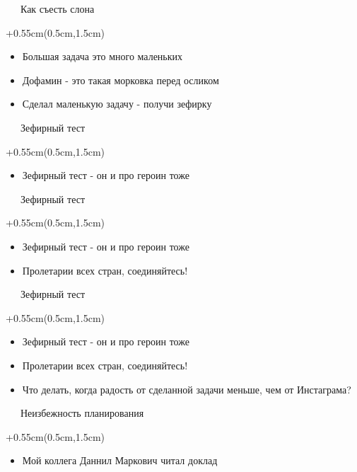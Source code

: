 \documentclass[xetex,18pt,aspectratio=169]{beamer}
\begin{document}
\begin{Large}
\begin{frame}{\ \ \ Как съесть слона}
\begin{textblock*}{\framewidth+0.55cm}(0.5cm,1.5cm)
\begin{itemize}
  \item Большая задача это много маленьких
  \item Дофамин - это такая морковка перед осликом
  \item Сделал маленькую задачу - получи зефирку
\end{itemize}
\end{textblock*}
\end{frame}

\begin{frame}{\ \ \ Зефирный тест}
\begin{textblock*}{\framewidth+0.55cm}(0.5cm,1.5cm)
\begin{itemize}
  \item Зефирный тест - он и про героин тоже
\end{itemize}
\end{textblock*}
\end{frame}

\begin{frame}{\ \ \ Зефирный тест}
\begin{textblock*}{\framewidth+0.55cm}(0.5cm,1.5cm)
\begin{itemize}
  \item Зефирный тест - он и про героин тоже
  \item Пролетарии всех стран, соединяйтесь!
\end{itemize}
\end{textblock*}
\end{frame}

\begin{frame}{\ \ \ Зефирный тест}
\begin{textblock*}{\framewidth+0.55cm}(0.5cm,1.5cm)
\begin{itemize}
  \item Зефирный тест - он и про героин тоже
  \item Пролетарии всех стран, соединяйтесь!
  \item Что делать, когда радость от сделанной задачи меньше, чем от Инстаграма?
\end{itemize}
\end{textblock*}
\end{frame}

\begin{frame}{\ \ \ Неизбежность планирования}
\begin{textblock*}{\framewidth+0.55cm}(0.5cm,1.5cm)
\begin{itemize}
  \item Мой коллега Даннил Маркович читал доклад
\end{itemize}
\end{textblock*}
\end{frame}


\end{Large}
\end{document}
